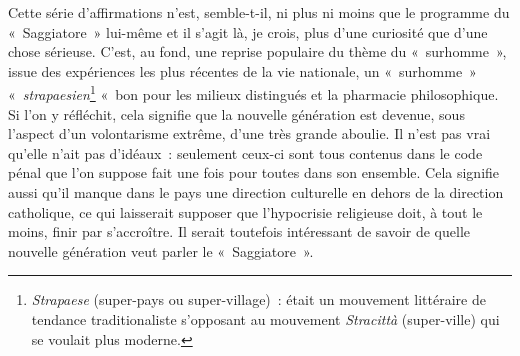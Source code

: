 \documentclass[french,twoside]{book} %
\begin{document}
Cette série d’affirmations n’est, semble-t-il, ni plus ni moins que le programme du « Saggiatore » lui-même et il s’agit là, je crois, plus d’une curiosité que d’une chose sérieuse. C'est, au fond, une reprise populaire du thème du « surhomme », issue des expériences les plus récentes de la vie nationale, un « surhomme » « \emph{strapaesien}\footnote{\emph{Strapaese} (super-pays ou super-village) : était un mouvement littéraire de tendance traditionaliste s’opposant au mouvement \emph{Stracittà} (super-ville) qui se voulait plus moderne.} « bon pour les milieux distingués et la pharmacie philosophique. Si l’on y réfléchit, cela signifie que la nouvelle génération est devenue, sous l’aspect d’un volontarisme extrême, d’une très grande aboulie. Il n’est pas vrai qu’elle n’ait pas d’idéaux : seulement ceux-ci sont tous contenus dans le code pénal que l’on suppose fait une fois pour toutes dans son ensemble. Cela signifie aussi qu’il manque dans le pays une direction culturelle en dehors de la direction catholique, ce qui laisserait supposer que l’hypocrisie religieuse doit, à tout le moins, finir par s’accroître. Il serait toutefois intéressant de savoir de quelle nouvelle génération veut parler le « Saggiatore ».\par
\end{document}
